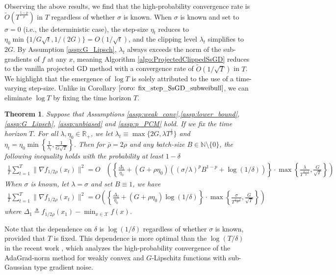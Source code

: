 \documentclass{article}
\newtheorem{theorem}{Theorem}
\def \X {\mathcal{X}}
\begin{document}
Observing the above results, we find that the high-probability convergence rate is $\widetilde{O}(T^{\frac{1-p}{p}})$ in $T$ regardless of whether $\sigma$ is known. When $\sigma$ is known and set to $\sigma=0$ (i.e., the deterministic case), the step-size $\eta_t$ reduces to $\eta_0\min\{1/G\sqrt{t},1/(2G)\}=O(1/\sqrt{t})$, and the clipping level $\lambda_t$ simplifies to $2G$. By Assumption \ref{assp:G_Lipsch}, $\lambda_t$ always exceeds the norm of the sub-gradients of $f$ at any $x$, meaning Algorithm \ref{algo:ProjectedClippedSsGD} reduces to the vanilla projected GD method with a convergence rate of $\tilde{O}(1/\sqrt{T})$ in $T$.
We highlight that the emergence of $\log T$ is solely attributed to the use of a time-varying step-size. Unlike in Corollary $\ref{coro: fix_step_SsGD_subweibull}$, we can eliminate $\log T$ by fixing the time horizon $T$.

\begin{theorem}\label{thm:projected_ssgd_pcm_HPB_fixtime}
    Suppose that Assumptions \ref{assp:weak_conv},\ref{assp:lower_bound}, \ref{assp:G_Lipsch}, \ref{assp:unbiased} and \ref{assp:p_PCM} hold. If we fix the time horizon $T$. For all $\lambda,\eta_0\in\mathbb{R}_+$, we let $\lambda_t\equiv\max\{2G,\lambda T^{\frac{1}{p}}\}$ and $\eta_t=\eta_0\min\left\{\frac{1}{\lambda_t},\frac{1}{G\sqrt{T}}\right\}$. Then for $\bar{\rho}=2\rho$ and any batch-size $B\in\mathbb{N}\setminus\{0\}$, the following inequality holds with the probability at least $1-\delta$
    \begin{align}
    \frac{1}{T}\sum_{t=1}^T\|\nabla f_{1/2\rho}(x_t)\|^2 = 
        O&\left(\left\{\frac{\Delta_1}{\eta_0}+(G+\rho\eta_0)\left((\sigma/\lambda)^pB^{1-p}+\log(1/\delta)\right)\right\}\cdot\max\left\{\frac{\lambda}{T^{\frac{p-1}{p}}},\frac{G}{\sqrt{T}}\right\}\right)
    \end{align}
When $\sigma$ is known, let $\lambda = \sigma$ and set $B\equiv1$, we have
\begin{align}
    \frac{1}{T}\sum_{t=1}^T\|\nabla f_{1/2\rho}(x_t)\|^2=O\left(\left\{\frac{\Delta_1}{\eta_0}+(G+\rho\eta_0)\log(1/\delta)\right\}\cdot\max\left\{\frac{\sigma}{T^{\frac{p-1}{p}}},\frac{G}{\sqrt{T}}\right\}\right)
\end{align}
where $\Delta_1\triangleq f_{1/2\rho}(x_1)-\min_{x\in\X} f(x)$.
\end{theorem}
Note that the dependence on $\delta$ is $\log(1/\delta)$ regardless of whether $\sigma$ is known, provided that $T$ is fixed. This dependence is more optimal than the $\log(T/\delta)$ in the recent work \citep{hong_2025}, which analyzes the high-probability convergence of the AdaGrad-norm method for weakly convex and $G$-Lipschitz functions with sub-Gaussian type gradient noise.
\end{document}
